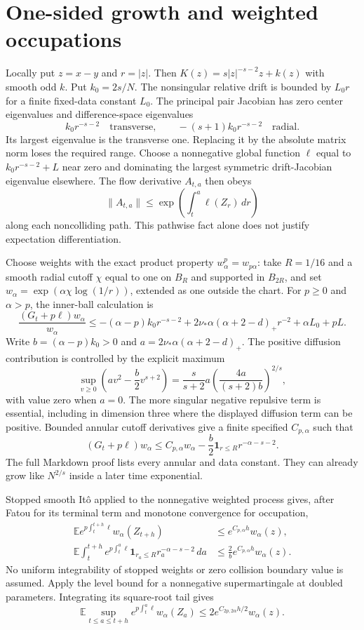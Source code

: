 \documentclass[10pt]{article}
\newcommand{\E}{\mathbb E}
\begin{document}
\section*{One-sided growth and weighted occupations}
Locally put $z=x-y$ and $r=|z|$. Then $K(z)=s|z|^{-s-2}z+k(z)$
with smooth odd $k$. Put $k_0=2s/N$. The nonsingular relative drift
is bounded by $L_0r$ for a finite fixed-data constant $L_0$.
The principal pair Jacobian has zero center eigenvalues and difference-space
eigenvalues
\[
 k_0r^{-s-2}\quad\text{transverse},\qquad
 -(s+1)k_0r^{-s-2}\quad\text{radial}.
\]
Its largest eigenvalue is the transverse one. Replacing it by the absolute
matrix norm loses the required range. Choose a nonnegative global function
$\ell$ equal to $k_0r^{-s-2}+L$ near zero and dominating the largest symmetric
drift-Jacobian eigenvalue elsewhere. The flow derivative $A_{t,a}$ then obeys
\[
 \|A_{t,a}\|\le\exp\left(\int_t^a\ell(Z_r)\,dr\right)
\]
along each noncolliding path. This pathwise fact alone does not justify
expectation differentiation.

Choose weights with the exact product property $w_\alpha^p=w_{p\alpha}$:
take $R=1/16$ and a smooth radial cutoff $\chi$ equal to one on $B_R$
and supported in $B_{2R}$, and set
$w_\alpha=\exp(\alpha\chi\log(1/r))$, extended as one outside the chart.
For $p\ge0$ and $\alpha>p$, the inner-ball calculation is
\[
 \frac{(G_t+p\ell)w_\alpha}{w_\alpha}
 \le-(\alpha-p)k_0r^{-s-2}
      +2\nu_*\alpha(\alpha+2-d)_+r^{-2}+\alpha L_0+pL.
\]
Write $b=(\alpha-p)k_0>0$ and $a=2\nu_*\alpha(\alpha+2-d)_+$.
The positive diffusion contribution is controlled by the explicit maximum
\[
 \sup_{v\ge0}\left(av^2-\frac b2v^{s+2}\right)
 =\frac{s}{s+2}a\left(\frac{4a}{(s+2)b}\right)^{2/s},
\]
with value zero when $a=0$. The more singular negative repulsive term is
essential, including in dimension three where the displayed diffusion term
can be positive. Bounded annular cutoff derivatives give a finite specified
$C_{p,\alpha}$ such that
\[
 (G_t+p\ell)w_\alpha\le C_{p,\alpha}w_\alpha
 -\frac b2\mathbf1_{r\le R}r^{-\alpha-s-2}.
\]
The full Markdown proof lists every annular and data constant. They can
already grow like $N^{2/s}$ inside a later time exponential.

Stopped smooth It\^o applied to the nonnegative weighted process gives,
after Fatou for its terminal term and monotone convergence for occupation,
\begin{align*}
 \E e^{p\int_t^{t+h}\ell}w_\alpha(Z_{t+h})
     &\le e^{C_{p,\alpha}h}w_\alpha(z),\\
 \E\int_t^{t+h}e^{p\int_t^a\ell}
       \mathbf1_{r_a\le R}r_a^{-\alpha-s-2}\,da
     &\le\frac2b e^{C_{p,\alpha}h}w_\alpha(z).
\end{align*}
No uniform integrability of stopped weights or zero collision boundary value is
assumed. Apply the level bound for a nonnegative supermartingale at doubled
parameters. Integrating its square-root tail gives
\[
 \E\sup_{t\le a\le t+h}e^{p\int_t^a\ell}w_\alpha(Z_a)
 \le2e^{C_{2p,2\alpha}h/2}w_\alpha(z).
\]
\end{document}
